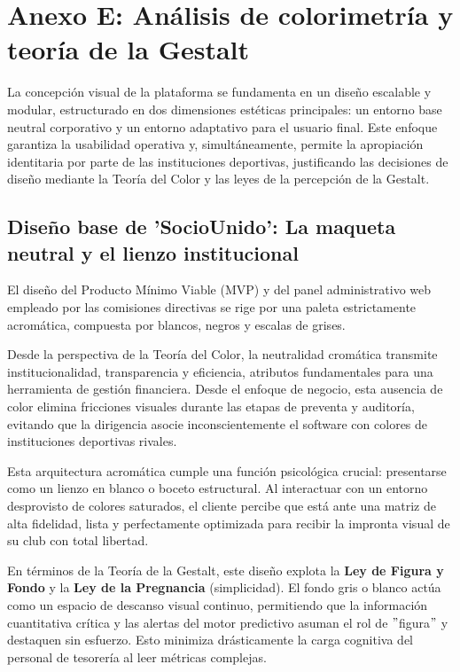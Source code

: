 \section{Anexo E: Análisis de colorimetría y teoría de la Gestalt}

La concepción visual de la plataforma se fundamenta en un diseño escalable y modular, estructurado en dos dimensiones estéticas principales: un entorno base neutral corporativo y un entorno adaptativo para el usuario final. Este enfoque garantiza la usabilidad operativa y, simultáneamente, permite la apropiación identitaria por parte de las instituciones deportivas, justificando las decisiones de diseño mediante la Teoría del Color y las leyes de la percepción de la Gestalt.

\subsection{Diseño base de 'SocioUnido': La maqueta neutral y el lienzo institucional}

El diseño del Producto Mínimo Viable (MVP) y del panel administrativo web empleado por las comisiones directivas se rige por una paleta estrictamente acromática, compuesta por blancos, negros y escalas de grises.

Desde la perspectiva de la Teoría del Color, la neutralidad cromática transmite institucionalidad, transparencia y eficiencia, atributos fundamentales para una herramienta de gestión financiera. Desde el enfoque de negocio, esta ausencia de color elimina fricciones visuales durante las etapas de preventa y auditoría, evitando que la dirigencia asocie inconscientemente el software con colores de instituciones deportivas rivales.

Esta arquitectura acromática cumple una función psicológica crucial: presentarse como un lienzo en blanco o boceto estructural. Al interactuar con un entorno desprovisto de colores saturados, el cliente percibe que está ante una matriz de alta fidelidad, lista y perfectamente optimizada para recibir la impronta visual de su club con total libertad.

En términos de la Teoría de la Gestalt, este diseño explota la \textbf{Ley de Figura y Fondo} y la \textbf{Ley de la Pregnancia} (simplicidad). El fondo gris o blanco actúa como un espacio de descanso visual continuo, permitiendo que la información cuantitativa crítica y las alertas del motor predictivo asuman el rol de $"$figura$"$ y destaquen sin esfuerzo. Esto minimiza drásticamente la carga cognitiva del personal de tesorería al leer métricas complejas.

